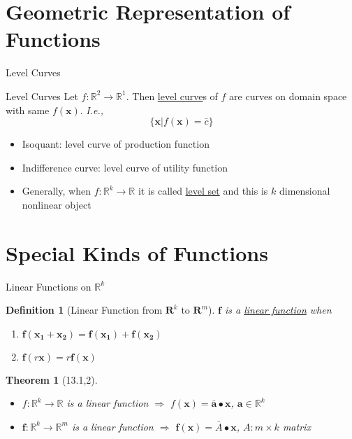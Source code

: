 \documentclass[final]{beamer}
\newtheorem{defn}{Definition}
\newtheorem{thm}{Theorem}
\begin{document}
\section{Geometric Representation of Functions} %
\label{sec:geometric_representation_of_functions}
\begin{frame}[t]{Level Curves}
	\begin{block}
		{Level Curves}
		Let $f:\mathbb{R}^2\rightarrow\mathbb{R}^1$. Then \uline{level curve}s of $f$ are curves on domain space with same $f(\mathbf{x})$. \textit{I.e.,}
		\[
			\{\mathbf{x}\vert f(\mathbf{x})=\bar c\}
		\]
		\begin{itemize}
			\item Isoquant: level curve of production function
			\item Indifference curve: level curve of utility function
			\item Generally, when $f:\mathbb{R}^k\rightarrow\mathbb{R}$ it is called \uline{level set} and this is $k$ dimensional nonlinear object
		\end{itemize}
	\end{block}
\end{frame}

\section{Special Kinds of Functions} %
\label{sec:special_kinds_of_functions}
\begin{frame}[t]{Linear Functions on $\mathbb{R}^k$}
	\begin{defn}
		[Linear Function from $\mathbf{R}^k$ to $\mathbf{R}^m$]
		$\mathbf{f}$ is a \uline{linear function} when
		\begin{enumerate}
			\item $\mathbf{f}(\mathbf{x_1}+\mathbf{x_2})=\mathbf{f}(\mathbf{x_1})+\mathbf{f}(\mathbf{x_2})$
			\item $\mathbf{f}(r\mathbf{x})=r\mathbf{f(x)}$
		\end{enumerate}
	\end{defn}
	\begin{thm}
		[13.1,2] \begin{itemize}
			\item $f:\mathbb{R}^k\rightarrow\mathbb{R}$ is a linear function $\Rightarrow$ $f(\mathbf{x})=\bar{\mathbf{a}}\bullet\mathbf{x}$, $\mathbf{a}\in\mathbb{R}^k$
			\item $\mathbf{f}:\mathbb{R}^k\rightarrow\mathbb{R}^m$ is a linear function $\Rightarrow$ $\mathbf{f}(\mathbf{x})=\bar A\bullet\mathbf{x}$, $A:m\times k$ matrix
		\end{itemize}
		
	\end{thm}
\end{frame}
\end{document}
